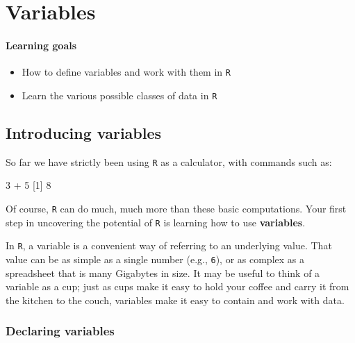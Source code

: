 \documentclass[
]{book}
\newenvironment{Shaded}{\begin{snugshade}}{\end{snugshade}}
\newcommand{\DecValTok}[1]{\textcolor[rgb]{0.00,0.00,0.81}{#1}}
\newcommand{\NormalTok}[1]{#1}
\newcommand{\SpecialCharTok}[1]{\textcolor[rgb]{0.00,0.00,0.00}{#1}}
\providecommand{\tightlist}{%
  \setlength{\itemsep}{0pt}\setlength{\parskip}{0pt}}
\begin{document}
\hypertarget{variables}{%
\chapter{Variables}\label{variables}}

\hypertarget{learning-goals-2}{%
\subsubsection*{Learning goals}\label{learning-goals-2}}

\begin{itemize}
\tightlist
\item
  How to define variables and work with them in \texttt{R}\\
\item
  Learn the various possible classes of data in \texttt{R}
\end{itemize}

\hypertarget{introducing-variables}{%
\section*{Introducing variables}\label{introducing-variables}}

So far we have strictly been using \texttt{R} as a calculator, with commands such as:

\begin{Shaded}
\begin{Highlighting}[]
\DecValTok{3} \SpecialCharTok{+} \DecValTok{5}
\NormalTok{[}\DecValTok{1}\NormalTok{] }\DecValTok{8}
\end{Highlighting}
\end{Shaded}

Of course, \texttt{R} can do much, much more than these basic computations. Your first step in uncovering the potential of \texttt{R} is learning how to use \textbf{variables}.

In \texttt{R}, a variable is a convenient way of referring to an underlying value. That value can be as simple as a single number (e.g., \texttt{6}), or as complex as a spreadsheet that is many Gigabytes in size. It may be useful to think of a variable as a cup; just as cups make it easy to hold your coffee and carry it from the kitchen to the couch, variables make it easy to contain and work with data.

\hypertarget{declaring-variables}{%
\subsection*{Declaring variables}\label{declaring-variables}}
\end{document}
